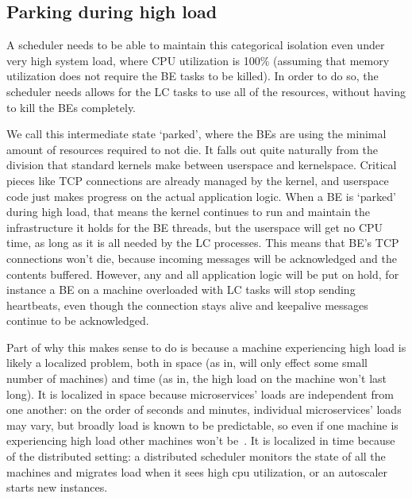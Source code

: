 \subsection{Parking during high load}\label{ss:approach:parking}

A scheduler needs to be able to maintain this categorical isolation even under
very high system load, where CPU utilization is 100\% (assuming that memory
utilization does not require the BE tasks to be killed). In order to do so, the scheduler needs allows for the LC tasks
to use all of the resources, without having to kill the BEs completely.

We call this intermediate state `parked', where the BEs are using the minimal
amount of resources required to not die. It falls out quite naturally from the
division that standard kernels make between userspace and kernelspace. Critical
pieces like TCP connections  are already managed by the
kernel, and userspace code just makes progress on the actual application logic.
When a BE is `parked' during high load, that means the kernel continues to run
and maintain the infrastructure it holds for the BE threads, but the userspace
will get no CPU time, as long as it is all needed by the LC processes. This
means that BE's TCP connections won't die, because incoming messages will be
acknowledged and the contents buffered. However, any and all application logic
will be put on hold, for instance a BE on a machine overloaded with LC tasks
will stop sending heartbeats, even though the connection stays alive and
keepalive messages continue to be acknowledged.

Part of why this makes sense to do is because a machine experiencing high load
is likely a localized problem, both in space (as in, will only effect some small
number of machines) and time (as in, the high load on the machine won't last
long). It is localized in space because microservices' loads are independent
from one another: on the order of seconds and minutes, individual microservices'
loads may vary, but broadly load is known to be predictable, so even if one
machine is experiencing high load other machines won't be~\cite{TODO}. It is
localized in time because of the distributed setting: a distributed scheduler
monitors the state of all the machines and migrates load when it sees high cpu
utilization, or an autoscaler starts new instances.